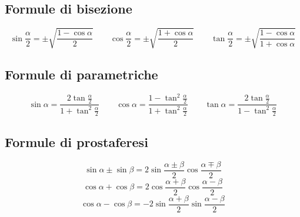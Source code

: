 \documentclass{article}
\begin{document}
  \subsection*{Formule di bisezione}
  \begin{equation}
    \sin\frac{\alpha}{2} = \pm \sqrt{\frac{1-\cos\alpha}{2}}
    \qquad
    \cos\frac{\alpha}{2} = \pm \sqrt{\frac{1+\cos\alpha}{2}}
    \qquad
    \tan\frac{\alpha}{2} = \pm \sqrt{\frac{1-\cos\alpha}{1+\cos\alpha}}
  \end{equation}

  \subsection*{Formule di parametriche}
  \begin{equation}
    \sin\alpha = \frac{2\tan\frac{\alpha}{2}}{1+\tan^2 \frac{\alpha}{2}}
    \qquad
    \cos\alpha = \frac{1-\tan^2 \frac{\alpha}{2}}{1+\tan^2 \frac{\alpha}{2}}
    \qquad
    \tan\alpha = \frac{2\tan\frac{\alpha}{2}}{1-\tan^2 \frac{\alpha}{2}}
  \end{equation}

  \subsection*{Formule di prostaferesi}
  \begin{equation}
    \sin\alpha \pm \sin\beta = 2 \sin\frac{\alpha \pm \beta}{2} \cos\frac{\alpha \mp \beta}{2}
  \end{equation}
  \begin{equation}
    \cos\alpha + \cos\beta = 2 \cos\frac{\alpha + \beta}{2} \cos\frac{\alpha - \beta}{2}
  \end{equation}
  \begin{equation}
    \cos\alpha - \cos\beta = -2 \sin\frac{\alpha + \beta}{2} \sin\frac{\alpha - \beta}{2}
  \end{equation}
\end{document}
